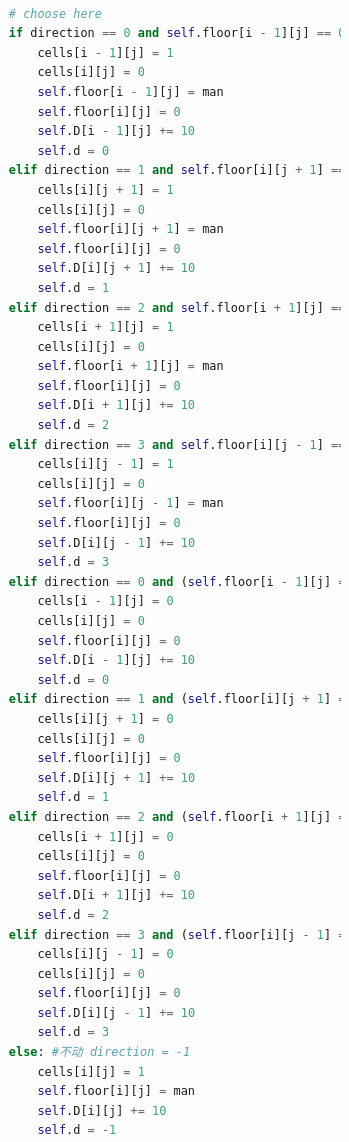 \documentclass{mcmthesis}
\begin{document}
\begin{lstlisting}[language=Python]
    
                        # choose here
                        if direction == 0 and self.floor[i - 1][j] == 0:   
                            cells[i - 1][j] = 1
                            cells[i][j] = 0
                            self.floor[i - 1][j] = man
                            self.floor[i][j] = 0
                            self.D[i - 1][j] += 10
                            self.d = 0
                        elif direction == 1 and self.floor[i][j + 1] == 0:
                            cells[i][j + 1] = 1
                            cells[i][j] = 0
                            self.floor[i][j + 1] = man
                            self.floor[i][j] = 0
                            self.D[i][j + 1] += 10
                            self.d = 1
                        elif direction == 2 and self.floor[i + 1][j] == 0:
                            cells[i + 1][j] = 1
                            cells[i][j] = 0
                            self.floor[i + 1][j] = man
                            self.floor[i][j] = 0
                            self.D[i + 1][j] += 10
                            self.d = 2
                        elif direction == 3 and self.floor[i][j - 1] == 0:
                            cells[i][j - 1] = 1
                            cells[i][j] = 0
                            self.floor[i][j - 1] = man
                            self.floor[i][j] = 0
                            self.D[i][j - 1] += 10
                            self.d = 3
                        elif direction == 0 and (self.floor[i - 1][j] == 2 or self.floor[i - 1][j] == 3):  #
                            cells[i - 1][j] = 0
                            cells[i][j] = 0
                            self.floor[i][j] = 0
                            self.D[i - 1][j] += 10
                            self.d = 0
                        elif direction == 1 and (self.floor[i][j + 1] == 2 or self.floor[i][j + 1] == 3):
                            cells[i][j + 1] = 0
                            cells[i][j] = 0
                            self.floor[i][j] = 0
                            self.D[i][j + 1] += 10
                            self.d = 1
                        elif direction == 2 and (self.floor[i + 1][j] == 2 or self.floor[i + 1][j] == 3):
                            cells[i + 1][j] = 0
                            cells[i][j] = 0
                            self.floor[i][j] = 0
                            self.D[i + 1][j] += 10
                            self.d = 2
                        elif direction == 3 and (self.floor[i][j - 1] == 2 or self.floor[i][j - 1] == 3):
                            cells[i][j - 1] = 0
                            cells[i][j] = 0
                            self.floor[i][j] = 0
                            self.D[i][j - 1] += 10
                            self.d = 3
                        else: #不动 direction = -1
                            cells[i][j] = 1
                            self.floor[i][j] = man
                            self.D[i][j] += 10
                            self.d = -1
    

\end{lstlisting}
\end{document}

